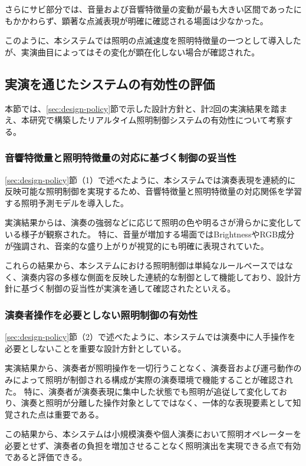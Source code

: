 さらにサビ部分では、音量および音響特徴量の変動が最も大きい区間であったにもかかわらず、顕著な点滅表現が明確に確認される場面は少なかった。

このように、本システムでは照明の点滅速度を照明特徴量の一つとして導入したが、実演曲目によってはその変化が顕在化しない場合が確認された。

\subsection{実演を通じたシステムの有効性の評価}

本節では、\ref{sec:design-policy}節で示した設計方針と、計2回の実演結果を踏まえ、本研究で構築したリアルタイム照明制御システムの有効性について考察する。

\subsubsection{音響特徴量と照明特徴量の対応に基づく制御の妥当性}

\ref{sec:design-policy}節（1）で述べたように、本システムでは演奏表現を連続的に反映可能な照明制御を実現するため、音響特徴量と照明特徴量の対応関係を学習する照明予測モデルを導入した。

実演結果からは、演奏の強弱などに応じて照明の色や明るさが滑らかに変化している様子が観察された。
特に、音量が増加する場面ではBrightnessやRGB成分が強調され、音楽的な盛り上がりが視覚的にも明確に表現されていた。

これらの結果から、本システムにおける照明制御は単純なルールベースではなく、演奏内容の多様な側面を反映した連続的な制御として機能しており、設計方針に基づく制御の妥当性が実演を通して確認されたといえる。

\subsubsection{演奏者操作を必要としない照明制御の有効性}

\ref{sec:design-policy}節（2）で述べたように、本システムでは演奏中に人手操作を必要としないことを重要な設計方針としている。

実演結果から、演奏者が照明操作を一切行うことなく、演奏音および運弓動作のみによって照明が制御される構成が実際の演奏環境で機能することが確認された。
特に、演奏者が演奏表現に集中した状態でも照明が追従して変化しており、演奏と照明が分離した操作対象としてではなく、一体的な表現要素として知覚された点は重要である。

この結果から、本システムは小規模演奏や個人演奏において照明オペレーターを必要とせず、演奏者の負担を増加させることなく照明演出を実現できる点で有効であると評価できる。

